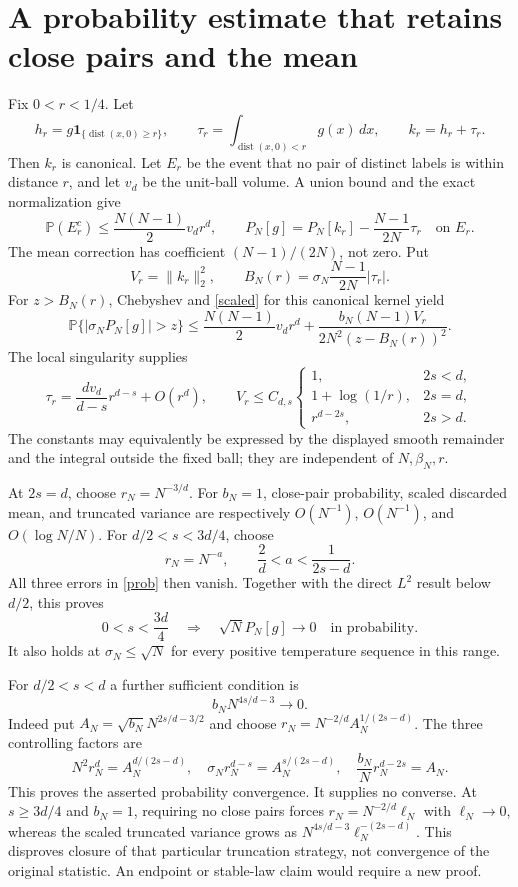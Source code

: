 \documentclass[11pt]{article}
\newcommand{\Prob}{\mathbb P}
\begin{document}
\section{A probability estimate that retains close pairs and the mean}
Fix $0<r<1/4$. Let
\[
 h_r=g\mathbf1_{\{\operatorname{dist}(x,0)\ge r\}},\qquad
 \tau_r=\int_{\operatorname{dist}(x,0)<r}g(x)\,dx,\qquad
 k_r=h_r+\tau_r.
\]
Then $k_r$ is canonical. Let $E_r$ be the event that no pair of distinct
labels is within distance $r$, and let $v_d$ be the unit-ball volume.
A union bound and the exact normalization give
\[
 \Prob(E_r^c)\le\frac{N(N-1)}2v_dr^d,
 \qquad
 P_N[g]=P_N[k_r]-\frac{N-1}{2N}\tau_r\quad\text{on }E_r.
\]
The mean correction has coefficient $(N-1)/(2N)$, not zero. Put
\[
 V_r=\|k_r\|_2^2,\qquad
 B_N(r)=\sigma_N\frac{N-1}{2N}|\tau_r|.
\]
For $z>B_N(r)$, Chebyshev and \eqref{scaled} for this canonical kernel yield
\begin{equation}\label{prob}
 \Prob\{|\sigma_NP_N[g]|>z\}
 \le\frac{N(N-1)}2v_dr^d+
       \frac{b_N(N-1)V_r}{2N^2(z-B_N(r))^2}.
\end{equation}
The local singularity supplies
\[
 \tau_r=\frac{dv_d}{d-s}r^{d-s}+O(r^d),\qquad
 V_r\le C_{d,s}
 \begin{cases}
 1,&2s<d,\\
 1+\log(1/r),&2s=d,\\
 r^{d-2s},&2s>d.
 \end{cases}
\]
The constants may equivalently be expressed by the displayed smooth
remainder and the integral outside the fixed ball; they are independent
of $N,\beta_N,r$.

At $2s=d$, choose $r_N=N^{-3/d}$. For $b_N=1$, close-pair probability,
scaled discarded mean, and truncated variance are respectively
$O(N^{-1})$, $O(N^{-1})$, and $O(\log N/N)$. For $d/2<s<3d/4$, choose
\[
 r_N=N^{-a},\qquad \frac2d<a<\frac1{2s-d}.
\]
All three errors in \eqref{prob} then vanish. Together with the direct
$L^2$ result below $d/2$, this proves
\[
 0<s<\frac{3d}4\quad\Longrightarrow\quad
 \sqrt N P_N[g]\longrightarrow0\quad\text{in probability}.
\]
It also holds at $\sigma_N\le\sqrt N$ for every positive temperature
sequence in this range.

For $d/2<s<d$ a further sufficient condition is
\[
 b_NN^{4s/d-3}\longrightarrow0.
\]
Indeed put $A_N=\sqrt{b_N}N^{2s/d-3/2}$ and choose
$r_N=N^{-2/d}A_N^{1/(2s-d)}$. The three controlling factors are
\[
 N^2r_N^d=A_N^{d/(2s-d)},\quad
 \sigma_Nr_N^{d-s}=A_N^{s/(2s-d)},\quad
 \frac{b_N}{N}r_N^{d-2s}=A_N.
\]
This proves the asserted probability convergence. It supplies no converse.
At $s\ge3d/4$ and $b_N=1$, requiring no close pairs forces
$r_N=N^{-2/d}\ell_N$ with $\ell_N\to0$, whereas the scaled truncated
variance grows as $N^{4s/d-3}\ell_N^{-(2s-d)}$. This disproves closure of
that particular truncation strategy, not convergence of the original
statistic. An endpoint or stable-law claim would require a new proof.
\end{document}
